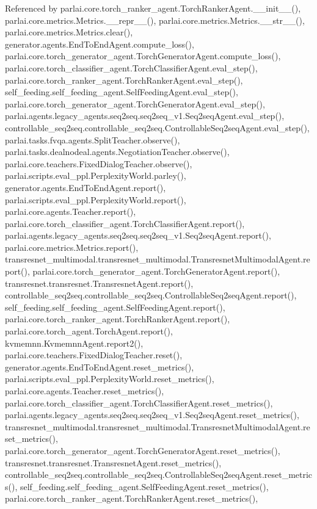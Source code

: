 Referenced by parlai.\+core.\+torch\+\_\+ranker\+\_\+agent.\+Torch\+Ranker\+Agent.\+\_\+\+\_\+init\+\_\+\+\_\+(), parlai.\+core.\+metrics.\+Metrics.\+\_\+\+\_\+repr\+\_\+\+\_\+(), parlai.\+core.\+metrics.\+Metrics.\+\_\+\+\_\+str\+\_\+\+\_\+(), parlai.\+core.\+metrics.\+Metrics.\+clear(), generator.\+agents.\+End\+To\+End\+Agent.\+compute\+\_\+loss(), parlai.\+core.\+torch\+\_\+generator\+\_\+agent.\+Torch\+Generator\+Agent.\+compute\+\_\+loss(), parlai.\+core.\+torch\+\_\+classifier\+\_\+agent.\+Torch\+Classifier\+Agent.\+eval\+\_\+step(), parlai.\+core.\+torch\+\_\+ranker\+\_\+agent.\+Torch\+Ranker\+Agent.\+eval\+\_\+step(), self\+\_\+feeding.\+self\+\_\+feeding\+\_\+agent.\+Self\+Feeding\+Agent.\+eval\+\_\+step(), parlai.\+core.\+torch\+\_\+generator\+\_\+agent.\+Torch\+Generator\+Agent.\+eval\+\_\+step(), parlai.\+agents.\+legacy\+\_\+agents.\+seq2seq.\+seq2seq\+\_\+v1.\+Seq2seq\+Agent.\+eval\+\_\+step(), controllable\+\_\+seq2seq.\+controllable\+\_\+seq2seq.\+Controllable\+Seq2seq\+Agent.\+eval\+\_\+step(), parlai.\+tasks.\+fvqa.\+agents.\+Split\+Teacher.\+observe(), parlai.\+tasks.\+dealnodeal.\+agents.\+Negotiation\+Teacher.\+observe(), parlai.\+core.\+teachers.\+Fixed\+Dialog\+Teacher.\+observe(), parlai.\+scripts.\+eval\+\_\+ppl.\+Perplexity\+World.\+parley(), generator.\+agents.\+End\+To\+End\+Agent.\+report(), parlai.\+scripts.\+eval\+\_\+ppl.\+Perplexity\+World.\+report(), parlai.\+core.\+agents.\+Teacher.\+report(), parlai.\+core.\+torch\+\_\+classifier\+\_\+agent.\+Torch\+Classifier\+Agent.\+report(), parlai.\+agents.\+legacy\+\_\+agents.\+seq2seq.\+seq2seq\+\_\+v1.\+Seq2seq\+Agent.\+report(), parlai.\+core.\+metrics.\+Metrics.\+report(), transresnet\+\_\+multimodal.\+transresnet\+\_\+multimodal.\+Transresnet\+Multimodal\+Agent.\+report(), parlai.\+core.\+torch\+\_\+generator\+\_\+agent.\+Torch\+Generator\+Agent.\+report(), transresnet.\+transresnet.\+Transresnet\+Agent.\+report(), controllable\+\_\+seq2seq.\+controllable\+\_\+seq2seq.\+Controllable\+Seq2seq\+Agent.\+report(), self\+\_\+feeding.\+self\+\_\+feeding\+\_\+agent.\+Self\+Feeding\+Agent.\+report(), parlai.\+core.\+torch\+\_\+ranker\+\_\+agent.\+Torch\+Ranker\+Agent.\+report(), parlai.\+core.\+torch\+\_\+agent.\+Torch\+Agent.\+report(), kvmemnn.\+Kvmemnn\+Agent.\+report2(), parlai.\+core.\+teachers.\+Fixed\+Dialog\+Teacher.\+reset(), generator.\+agents.\+End\+To\+End\+Agent.\+reset\+\_\+metrics(), parlai.\+scripts.\+eval\+\_\+ppl.\+Perplexity\+World.\+reset\+\_\+metrics(), parlai.\+core.\+agents.\+Teacher.\+reset\+\_\+metrics(), parlai.\+core.\+torch\+\_\+classifier\+\_\+agent.\+Torch\+Classifier\+Agent.\+reset\+\_\+metrics(), parlai.\+agents.\+legacy\+\_\+agents.\+seq2seq.\+seq2seq\+\_\+v1.\+Seq2seq\+Agent.\+reset\+\_\+metrics(), transresnet\+\_\+multimodal.\+transresnet\+\_\+multimodal.\+Transresnet\+Multimodal\+Agent.\+reset\+\_\+metrics(), parlai.\+core.\+torch\+\_\+generator\+\_\+agent.\+Torch\+Generator\+Agent.\+reset\+\_\+metrics(), transresnet.\+transresnet.\+Transresnet\+Agent.\+reset\+\_\+metrics(), controllable\+\_\+seq2seq.\+controllable\+\_\+seq2seq.\+Controllable\+Seq2seq\+Agent.\+reset\+\_\+metrics(), self\+\_\+feeding.\+self\+\_\+feeding\+\_\+agent.\+Self\+Feeding\+Agent.\+reset\+\_\+metrics(), parlai.\+core.\+torch\+\_\+ranker\+\_\+agent.\+Torch\+Ranker\+Agent.\+reset\+\_\+metrics(), 